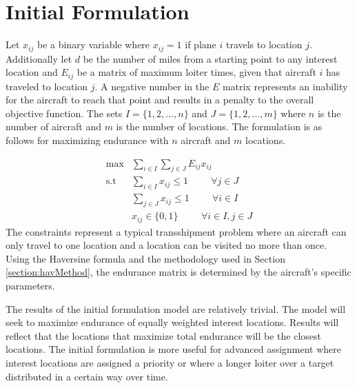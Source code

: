 \section{Initial Formulation}
Let $x_{ij}$ be a binary variable where $x_{ij} = 1$ if plane $i$ travels to location $j$. Additionally let $d$ be the number of miles from a starting point to any interest location and $E_{ij}$ be a matrix of maximum loiter times, given that aircraft $i$ has traveled to location $j$. A negative number in the $E$ matrix represents an inability for the aircraft to reach that point and results in a penalty to the overall objective function. The sets $I = \{1,2,\dots,n\}$ and $J = \{1,2,\dots,m\}$ where $n$ is the number of aircraft and $m$ is the number of locations. The formulation is as follows for maximizing endurance with $n$ aircraft and $m$ locations.\par
\begin{equation}
    \begin{aligned}
        \max &\sum_{i\in I}\sum_{j\in J} E_{ij}x_{ij}\hspace{1cm}\\
        \text{s.t } &\sum_{i\in I} x_{ij}\leq 1\hspace{1cm} \forall j\in J\\
        &\sum_{j\in J}x_{ij} \leq 1\hspace{1cm} \forall i \in I\\
        &x_{ij}\in \{0,1\} \hspace{1cm} \forall i\in I, j\in J
    \end{aligned}
\end{equation}
The constraints represent a typical transshipment problem where an aircraft can only travel to one location and a location can be visited no more than once. Using the Haversine formula and the methodology used in Section \ref{section:havMethod}, the endurance matrix is determined by the aircraft's specific parameters. \par
The results of the initial formulation model are relatively trivial. The model will seek to maximize endurance of equally weighted interest locations. Results will reflect that the locations that maximize total endurance will be the closest locations. The initial formulation is more useful for advanced assignment where interest locations are assigned a priority or where a longer loiter over a target distributed in a certain way over time.\par

